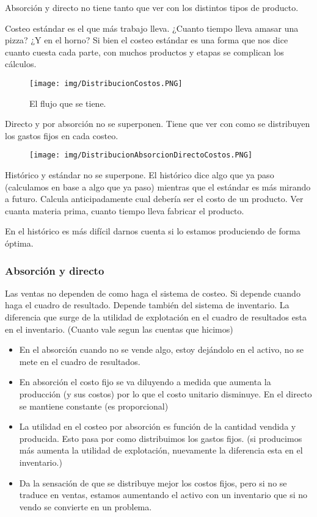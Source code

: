 \documentclass[titlepage,a4paper]{article}
\begin{document}
Absorción y directo no tiene tanto que ver con los distintos tipos de producto.

\medskip
Costeo estándar es el que más trabajo lleva. ¿Cuanto tiempo lleva amasar una pizza? ¿Y en el horno? Si bien el costeo estándar es una forma que nos dice cuanto cuesta cada parte, con muchos productos y etapas se complican los cálculos.

\begin{figure}[!htb]
    \centering
    \texttt{[image: img/DistribucionCostos.PNG]}
    \caption{El flujo que se tiene.}
\end{figure}

Directo y por absorción no se superponen. Tiene que ver con como se distribuyen los gastos fijos en cada costeo. 


\begin{figure}[!htb]
    \centering
    \texttt{[image: img/DistribucionAbsorcionDirectoCostos.PNG]}
\end{figure}


Histórico y estándar no se superpone. El histórico dice algo que ya paso (calculamos en base a algo que ya paso) mientras que el estándar es más mirando a futuro. Calcula anticipadamente cual debería ser el costo de un producto. Ver cuanta materia prima, cuanto tiempo lleva fabricar el producto.

En el histórico es más difícil darnos cuenta si lo estamos produciendo de forma óptima.

\subsubsection*{Absorción y directo}
Las ventas no dependen de como haga el sistema de costeo.
Si depende cuando haga el cuadro de resultado. Depende también del sistema de inventario. La diferencia que surge de la utilidad de explotación en el cuadro de resultados esta en el inventario. (Cuanto vale segun las cuentas que hicimos)

\begin{itemize}
    \item En el absorción cuando no se vende algo, estoy dejándolo en el activo, no se mete en el cuadro de resultados.
    \item En absorción el costo fijo se va diluyendo a medida que aumenta la producción (y sus costos) por lo que el costo unitario disminuye. En el directo se mantiene constante (es proporcional)
    \item La utilidad en el costeo por absorción es función de la cantidad vendida y producida. Esto pasa por como distribuimos los gastos fijos. (si producimos más aumenta la utilidad de explotación, nuevamente la diferencia esta en el inventario.)
    \item Da la sensación de que se distribuye mejor los costos fijos, pero si no se traduce en ventas, estamos aumentando el activo con un inventario que si no vendo se convierte en un problema.
\end{itemize}
\end{document}
